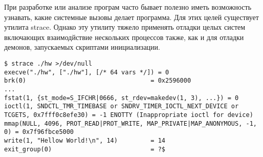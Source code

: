 \Introduction
При разработке или анализе програм часто бывает полезно иметь возможность 
узнавать, какие системные вызовы делает программа. Для этих целей 
существует утилита strace. 
Однако эту утилиту тяжело применять отладки целых систем включающих 
взаимодйствие нескольких процессов также, как и для отладки демонов, 
запускаемых скриптами инициализации.
\begin{lstlisting}[caption={Пример вывода strace Hellow World'а (вызовы, 
		связанные с динамической линковкой опущены)}]
$ strace ./hw >/dev/null
execve("./hw", ["./hw"], [/* 64 vars */]) = 0
brk(0)                                  = 0x2596000
...
fstat(1, {st_mode=S_IFCHR|0666, st_rdev=makedev(1, 3), ...}) = 0
ioctl(1, SNDCTL_TMR_TIMEBASE or SNDRV_TIMER_IOCTL_NEXT_DEVICE or TCGETS, 0x7fff0c8efe30) = -1 ENOTTY (Inappropriate ioctl for device)
mmap(NULL, 4096, PROT_READ|PROT_WRITE, MAP_PRIVATE|MAP_ANONYMOUS, -1, 0) = 0x7f96fbce5000
write(1, "Hellow World!\n", 14)         = 14
exit_group(0)                           = ?$ 
\end{lstlisting}




